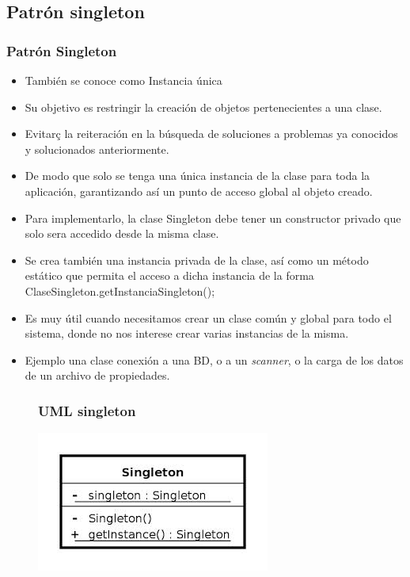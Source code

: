 \documentclass{beamer}
\begin{document}
\subsection{Patrón singleton}
\begin{frame}
\frametitle{Patrón Singleton }
\begin{scriptsize}

\begin{itemize}[<+->]
\item También se conoce como Instancia única
\item Su objetivo es restringir la creación de objetos  pertenecientes a una clase.
\item Evitarç la reiteración en la búsqueda de soluciones a problemas ya conocidos y solucionados anteriormente.
\item De modo que solo se tenga una única instancia de la clase para toda la aplicación, garantizando así un punto de acceso global al objeto creado. 
\item Para implementarlo, la clase Singleton debe tener un constructor privado que solo sera accedido desde la misma clase.
\item Se crea también una instancia privada de la clase, así como un método estático que permita el acceso a dicha instancia de la forma \alert{ClaseSingleton.getInstanciaSingleton();}
\item Es  muy útil cuando necesitamos crear un clase común y global para todo el sistema, donde no nos interese crear varias instancias de la misma.
\item Ejemplo una clase conexión a una BD, o a un \emph{scanner}, o la carga de los datos de un archivo de propiedades.

\end{itemize}

\end{scriptsize}
\end{frame}

\begin{frame}
\begin{figure}
\frametitle{UML singleton}
\includegraphics[scale=0.8]{imagenes/singleton.jpg}
\end{figure}
\end{frame}
\end{document}
